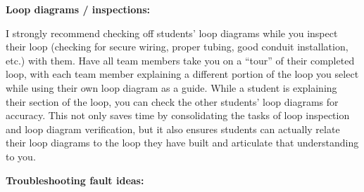 \noindent
{\bf Loop diagrams / inspections:}

I strongly recommend checking off students' loop diagrams while you inspect their loop (checking for secure wiring, proper tubing, good conduit installation, etc.) with them.  Have all team members take you on a ``tour'' of their completed loop, with each team member explaining a different portion of the loop you select while using their own loop diagram as a guide.  While a student is explaining their section of the loop, you can check the other students' loop diagrams for accuracy.  This not only saves time by consolidating the tasks of loop inspection and loop diagram verification, but it also ensures students can actually relate their loop diagrams to the loop they have built and articulate that understanding to you.

\vskip 10pt

\goodbreak

\noindent
{\bf Troubleshooting fault ideas:}

